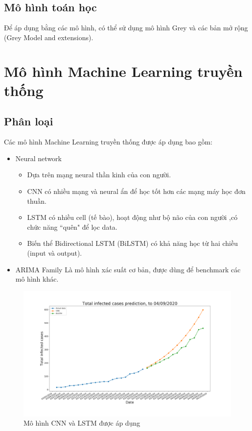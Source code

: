 ﻿\documentclass{article}
\begin{document}
\subsection{Mô hình toán học}

Để áp dụng bằng các mô hình, có thể sử dụng mô hình Grey và các bản mở rộng (Grey Model and extensions).

\section{ Mô hình Machine Learning truyền thống}

\subsection{Phân loại}
Các mô hình Machine Learning truyền thống được áp dụng bao gồm:

\begin{itemize}
    \item Neural network
    \begin{itemize}
        \item Dựa trên mạng neural thần kinh của con người.
        \item CNN có nhiều mạng và neural ẩn để học tốt hơn các mạng máy học đơn thuần.
        \item LSTM có nhiều cell (tế bào), hoạt động như bộ não của con người ,có chức năng “quên" để lọc data.
        \item Biến thể Bidirectional LSTM (BiLSTM) có khả năng học từ hai chiều (input và output). 
    \end{itemize}
    \item ARIMA Family
    Là mô hình xác suất cơ bản, được dùng để benchmark các mô hình khác.
\end{itemize}

    \begin{figure}
    \centering
    \includegraphics[scale=0.2]{cnn.png}
    \caption{Mô hình CNN và LSTM được áp dụng}
    \label{fig:cnnLSTM}
    \end{figure}
    
\end{document}
